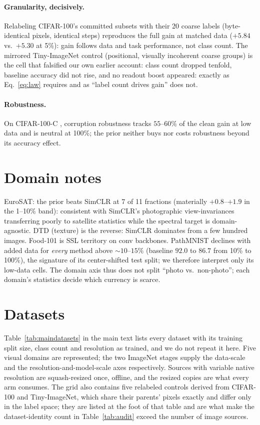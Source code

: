 \paragraph{Granularity, decisively.} Relabeling CIFAR-100's committed
subsets with their 20 coarse labels (byte-identical pixels, identical
steps) reproduces the full gain at matched data ($+5.84$ vs.\ $+5.30$ at
5\%): gain follows data and task performance, not class count. The
mirrored Tiny-ImageNet control (positional, visually incoherent coarse
groups) is the cell that falsified our own earlier account: class count
dropped tenfold, baseline accuracy did not rise, and no readout boost
appeared: exactly as Eq.~\ref{eq:law} requires and as ``label count
drives gain'' does not.

\paragraph{Robustness.} On CIFAR-100-C \citep{hendrycks2019benchmarking},
corruption robustness tracks $55$--$60\%$ of the clean gain at low data
and is neutral at 100\%; the prior neither buys nor costs robustness
beyond its accuracy effect.

\section{Domain notes}\label{app:domains}

EuroSAT: the prior beats SimCLR at 7 of 11 fractions (materially
$+0.8$--$+1.9$ in the 1--10\% band): consistent with SimCLR's
photographic view-invariances transferring poorly to satellite
statistics while the spectral target is domain-agnostic. DTD (texture)
is the reverse: SimCLR dominates from a few hundred images. Food-101 is
SSL territory on conv backbones. PathMNIST declines with added data for
\emph{every} method above ${\sim}10$--$15\%$ (baseline $92.0$ to $86.7$
from 10\% to 100\%), the signature of its center-shifted test split;
we therefore interpret only its low-data cells. The domain axis thus
does not split ``photo vs.\ non-photo''; each domain's statistics decide
which currency is scarce.

\section{Datasets}\label{app:datasets}

Table~\ref{tab:maindatasets} in the main text lists every dataset with its
training split size, class count and resolution as trained, and we do not
repeat it here. Five visual domains are represented; the two ImageNet
stages supply the data-scale and the resolution-and-model-scale axes
respectively. Sources with variable native resolution are squash-resized
once, offline, and the resized copies are what every arm consumes. The
grid also contains five relabeled controls derived from CIFAR-100 and
Tiny-ImageNet, which share their parents' pixels exactly and differ only
in the label space; they are listed at the foot of that table and are what
make the dataset-identity count in Table~\ref{tab:audit} exceed the number
of image sources.

